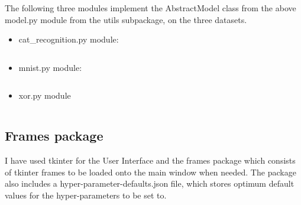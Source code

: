 \documentclass[./project-report/src/latex/project-report.tex]{subfiles}
\begin{document}
The following three modules implement the AbstractModel class from the above model.py module from the utils subpackage, on the three datasets.

\begin{itemize}
    \item cat\_recognition.py module:
        \inputminted{python}{./school_project/models/cpu/cat_recognition.py}
    \item mnist.py module:
        \inputminted{python}{./school_project/models/cpu/mnist.py}
    \item xor.py module
        \inputminted{python}{./school_project/models/cpu/xor.py}
\end{itemize}

\subsection{Frames package}

I have used tkinter for the User Interface and the frames package which consists of tkinter frames to be loaded onto the main window when needed. The package also 
includes a hyper-parameter-defaults.json file, which stores optimum default values for the hyper-parameters to be set to.
\end{document}
